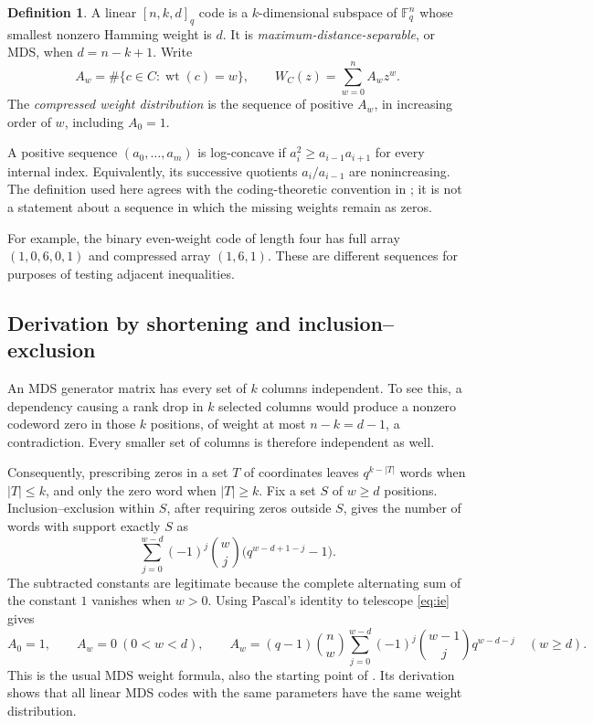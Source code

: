 \documentclass[11pt,letterpaper]{article}
\numberwithin{equation}{section}
\theoremstyle{definition}
\newtheorem{definition}[theorem]{Definition}
\newcommand{\F}{\mathbb F}
\newcommand{\wt}{\operatorname{wt}}
\begin{document}
\begin{definition}
A linear $[n,k,d]_q$ code is a $k$-dimensional subspace of $\F_q^n$
whose smallest nonzero Hamming weight is $d$. It is
\emph{maximum-distance-separable}, or MDS, when $d=n-k+1$.
Write
\[
 A_w=\#\{c\in C:\wt(c)=w\},\qquad
 W_C(z)=\sum_{w=0}^n A_wz^w.
\]
The \emph{compressed weight distribution} is the sequence of positive
$A_w$, in increasing order of $w$, including $A_0=1$.
\end{definition}

A positive sequence $(a_0,\ldots,a_m)$ is log-concave if
$a_i^2\ge a_{i-1}a_{i+1}$ for every internal index. Equivalently, its
successive quotients $a_i/a_{i-1}$ are nonincreasing. The definition
used here agrees with the coding-theoretic convention in
\cite{SWAK}; it is not a statement about a sequence in which the
missing weights remain as zeros.

For example, the binary even-weight code of length four has full
array $(1,0,6,0,1)$ and compressed array $(1,6,1)$. These are different
sequences for purposes of testing adjacent inequalities.

\subsection{Derivation by shortening and inclusion--exclusion}
An MDS generator matrix has every set of $k$ columns independent.
To see this, a dependency causing a rank drop in $k$ selected columns
would produce a nonzero codeword zero in those $k$ positions, of
weight at most $n-k=d-1$, a contradiction. Every smaller set of
columns is therefore independent as well.

Consequently, prescribing zeros in a set $T$ of coordinates leaves
$q^{k-|T|}$ words when $|T|\le k$, and only the zero word when
$|T|\ge k$. Fix a set $S$ of $w\ge d$ positions. Inclusion--exclusion
within $S$, after requiring zeros outside $S$, gives the number of
words with support exactly $S$ as
\begin{equation}\label{eq:ie}
 \sum_{j=0}^{w-d}(-1)^j\binom{w}{j}
       \bigl(q^{w-d+1-j}-1\bigr).
\end{equation}
The subtracted constants are legitimate because the complete
alternating sum of the constant $1$ vanishes when $w>0$.
Using Pascal's identity to telescope \eqref{eq:ie} gives
\begin{equation}\label{eq:mds}
 A_0=1,\qquad A_w=0\ (0<w<d),\qquad
 A_w=(q-1)\binom nw
       \sum_{j=0}^{w-d}(-1)^j\binom{w-1}{j}q^{w-d-j}
       \quad(w\ge d).
\end{equation}
This is the usual MDS weight formula, also the starting point of
\cite[Section~5]{SWAK}. Its derivation shows that all linear MDS codes
with the same parameters have the same weight distribution.
\end{document}
